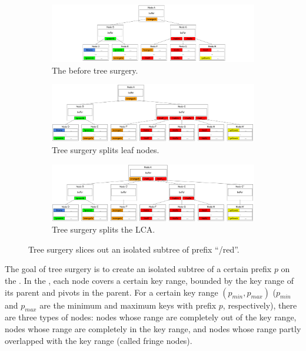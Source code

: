 \begin{figure}
    \begin{subfigure}{\textwidth}
        \centering
        \includegraphics[width=.9\linewidth]{fig/slice-1}
        \caption{\label{subfig:slice-1} The \bet before tree surgery.}
    \end{subfigure}
    \begin{subfigure}{\textwidth}
        \centering
        \includegraphics[width=.9\linewidth]{fig/slice-2}
        \caption{\label{subfig:slice-2} Tree surgery splits leaf nodes.}
    \end{subfigure}
    \begin{subfigure}{\textwidth}
        \centering
        \includegraphics[width=.9\linewidth]{fig/slice-3}
        \caption{\label{subfig:slice-3} Tree surgery splits the LCA.}
    \end{subfigure}
    \caption[Tree surgery example]{\label{fig:slice}
        Tree surgery slices out an isolated subtree of prefix ``/red''.}
\end{figure}

The goal of tree surgery is to create an isolated subtree of a certain
prefix $p$ on the \bet.
In the \bet, each node covers a certain key range, bounded by the key range of
its parent and pivots in the parent.
For a certain key range $(p_{min}, p_{max})$ ($p_{min}$ and $p_{max}$ are the
minimum and maximum keys with prefix $p$, respectively), there are three types
of nodes: nodes whose range are completely out of the key range, nodes whose
range are completely in the key range, and nodes whose range partly overlapped
with the key range (called fringe nodes).

